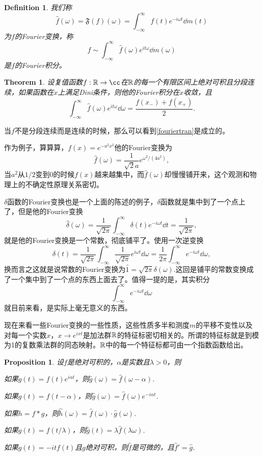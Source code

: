 \documentclass[10pt]{book}
\theoremstyle{plain}%
\newtheorem{pro}{Proposition}[chapter]%
\newtheorem{defi}{Definition}[chapter]%
\newtheorem{theo}{Theorem}[chapter]%
\begin{document}
\begin{defi}
我们称
\[
\hat{f}(\omega)=\mathfrak{F}(f)(\omega)=\int_{-\infty}^\infty f(t)e^{-i\omega t}\dd m(t)
\]
为$f$的Fourier变换，称
\[
	f\sim \int_{-\infty}^\infty \hat{f}(\omega)e^{it\omega}\dd m(\omega)
\]
是$f$的Fourier积分。
\end{defi}
\begin{theo}
设复值函数$f:\rr\to\cc$在$\mathbb{R}$的每一个有限区间上绝对可积且分段连续，如果函数在$x$上满足Dini条件，则他的Fourier积分在$x$收敛，且
\[
	\int_{-\infty}^\infty \hat{f}(\omega)e^{it\omega}\dd\omega=\frac{f(x_-)+f(x_+)}{2}.
\]
\end{theo}
当$f$不是分段连续而是连续的时候，那么可以看到\eqref{fouriertran}是成立的。

作为例子，算算算，$f(x)=e^{-a^2x^2}$他的Fourier变换为
\[
	\hat{f}(\omega)=\frac{1}{\sqrt{2}a}e^{\omega^2/(4a^2)},
\]
当$a^2$从$1/2$变到$0$的时候$f(x)$越来越集中，而$\hat{f}(\omega)$却慢慢铺开来，这个观测和物理上的不确定性原理关系密切。

$\delta$函数的Fourier变换也是一个上面的陈述的例子，$\delta$函数就是集中到了一个点上了，但是他的Fourier变换
\[
	\hat{\delta}(\omega)=\frac{1}{\sqrt{2\pi}}\int_{-\infty}^\infty \delta(t)e^{-i\omega t}\dd t=\frac{1}{\sqrt{2\pi}},
\]
就是他的Fourier变换是一个常数，彻底铺平了。使用一次逆变换
\[
	\delta(t)=\frac{1}{\sqrt{2\pi}}\int_{-\infty}^\infty \frac{1}{\sqrt{2\pi}}e^{i\omega t}\dd \omega=\frac{1}{2\pi}\int_{-\infty}^\infty e^{-i\omega t}\dd \omega,
\]
换而言之这就是说常数的Fourier变换为$\hat{1}=\sqrt{2\pi}\delta(\omega)$.这回是铺平的常数变换成了一个集中到了一个点的东西上面去了。值得一提的是，其实积分
\[
	\int_{-\infty}^\infty e^{-i\omega t}\dd \omega
\]
就目前来看，是实际上毫无意义的东西。

现在来看一些Fourier变换的一些性质，这些性质多半和测度$m$的平移不变性以及对每一个实数$x$，$x\to e^{ixt}$是加法群$\mathbb{R}$的特征标密切相关的。所谓的特征标就是到模为1的复数乘法群的同态映射。$\mathbb{R}$中的每一个特征标都可由一个指数函数给出。

\begin{pro}
设$f$是绝对可积的，$\alpha$是实数且$\lambda>0$，则

 如果$g(t)=f(t)e^{i\alpha t}$，则$\hat{g}(\omega)=\hat{f}(\omega-\alpha)$.

 如果$g(t)=f(t-\alpha)$，则$\hat{g}(\omega)=\hat{f}(\omega)e^{-i\alpha t}$.

 如果$h=f*g$，则$\hat{h}(\omega)=\hat{f}(\omega)\cdot\hat{g}(\omega)$.

 如果$g(t)=f(t/\lambda)$，则$\hat{g}(t)=\lambda\hat{f}(\lambda \omega)$.

 如果$g(t)=-itf(t)$且$g$绝对可积，则$\hat{f}$是可微的，且$\hat{f}'=\hat{g}$.
\end{pro}
\end{document}
